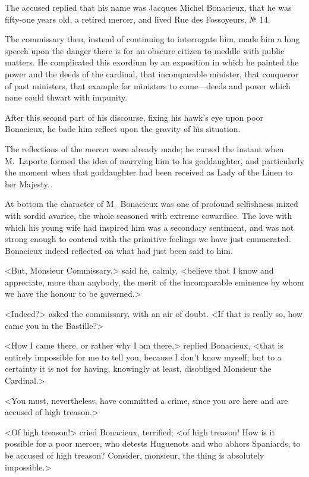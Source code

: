 The accused replied that his name was Jacques Michel Bonacieux, that he was fifty-one years old, a retired mercer, and lived Rue des Fossoyeurs, № 14. 

The commissary then, instead of continuing to interrogate him, made him a long speech upon the danger there is for an obscure citizen to meddle with public matters. He complicated this exordium by an exposition in which he painted the power and the deeds of the cardinal, that incomparable minister, that conqueror of past ministers, that example for ministers to come—deeds and power which none could thwart with impunity. 

After this second part of his discourse, fixing his hawk's eye upon poor Bonacieux, he bade him reflect upon the gravity of his situation. 

The reflections of the mercer were already made; he cursed the instant when M.~Laporte formed the idea of marrying him to his goddaughter, and particularly the moment when that goddaughter had been received as Lady of the Linen to her Majesty. 

At bottom the character of M.~Bonacieux was one of profound selfishness mixed with sordid avarice, the whole seasoned with extreme cowardice. The love with which his young wife had inspired him was a secondary sentiment, and was not strong enough to contend with the primitive feelings we have just enumerated. Bonacieux indeed reflected on what had just been said to him. 

<But, Monsieur Commissary,> said he, calmly, <believe that I know and appreciate, more than anybody, the merit of the incomparable eminence by whom we have the honour to be governed.> 

<Indeed?> asked the commissary, with an air of doubt. <If that is really so, how came you in the Bastille?> 

<How I came there, or rather why I am there,> replied Bonacieux, <that is entirely impossible for me to tell you, because I don't know myself; but to a certainty it is not for having, knowingly at least, disobliged Monsieur the Cardinal.> 

<You must, nevertheless, have committed a crime, since you are here and are accused of high treason.> 

<Of high treason!> cried Bonacieux, terrified; <of high treason! How is it possible for a poor mercer, who detests Huguenots and who abhors Spaniards, to be accused of high treason? Consider, monsieur, the thing is absolutely impossible.> 

